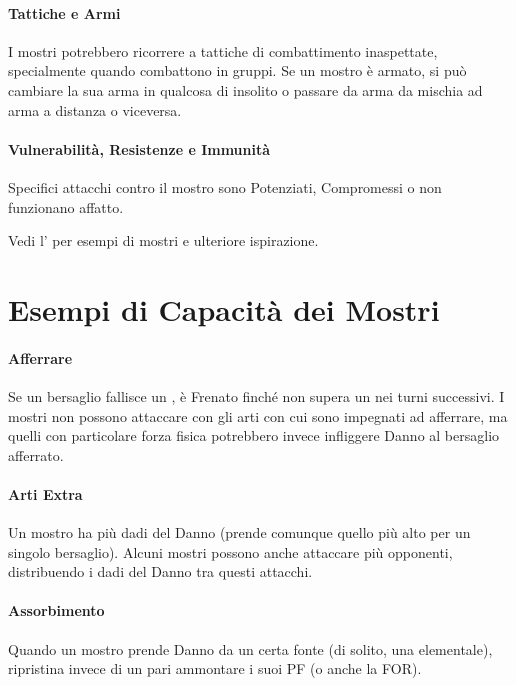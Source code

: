 \documentclass[itdr]{subfiles}
\begin{document}
\vfill
\paragraph{Tattiche e Armi}
I mostri potrebbero ricorrere a tattiche di combattimento inaspettate, specialmente quando combattono in gruppi. Se un mostro è armato, si può cambiare la sua arma in qualcosa di insolito o passare da arma da mischia ad arma a distanza o viceversa.

\vfill
\paragraph{Vulnerabilità, Resistenze e Immunità}
Specifici attacchi contro il mostro sono Potenziati, Compromessi o non funzionano affatto.

\vfill
\begin{dbox}
	Vedi l'\textbf{} per esempi di mostri e ulteriore ispirazione.
\end{dbox}

\vfill
\break

\section{Esempi di Capacità dei Mostri}

\paragraph{Afferrare}
Se un bersaglio fallisce un , è Frenato finché non supera un  nei turni successivi. I mostri non possono attaccare con gli arti con cui sono impegnati ad afferrare, ma quelli con particolare forza fisica potrebbero invece infliggere Danno al bersaglio afferrato.

\vfill
\paragraph{Arti Extra}
Un mostro ha più dadi del Danno (prende comunque quello più alto per un singolo bersaglio). Alcuni mostri possono anche attaccare più opponenti, distribuendo i dadi del Danno tra questi attacchi.

\vfill
\paragraph{Assorbimento}
Quando un mostro prende Danno da un certa fonte (di solito, una elementale), ripristina invece di un pari ammontare i suoi PF (o anche la FOR).
\end{document}
